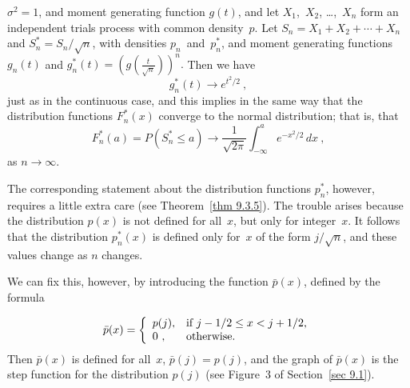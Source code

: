 $\sigma^2 = 1$, and moment generating function $g(t)$, and let $X_1$,~$X_2$,
\ldots,~$X_n$ form an independent trials process with common density~$p$.  Let
$S_n = X_1 + X_2 +\cdots+ X_n$ and $S_n^* = S_n/\sqrt n$, with densities
$p_n$~and~$p_n^*$, and moment generating functions $g_n(t)$ and
$g_n^*(t) = \left(g(\frac t{\sqrt n})\right)^n.$
Then we have
$$
g_n^*(t) \to e^{t^2/2}\ ,
$$
just as in the continuous case, and this implies in the same way that the
distribution functions $F_n^*(x)$ converge to the normal distribution; that is,
that
$$
F_n^*(a) = P(S_n^* \leq a) \to \frac1{\sqrt{2\pi}} \int_{-\infty}^a
e^{-x^2/2}\, dx\ ,
$$ 
as $n \rightarrow \infty$.
\par
The corresponding statement about the distribution functions $p_n^*$, however,
requires a little extra care (see Theorem~\ref{thm 9.3.5}).  The trouble arises
because the distribution $p(x)$ is not defined for all~$x$, but only for
integer~$x$.  It follows that the distribution $p_n^*(x)$ is defined only for~$x$ of
the form $j/\sqrt n$, and these values change as $n$ changes.

We can fix this, however, by introducing the function $\bar p(x)$, defined
by the formula

$$
\bar p(x) =  \left \{ \begin{array}{ll}
                        p(j), & \mbox{if $j - 1/2 \leq x < j + 1/2$,} \cr
                         0\ , & \mbox{otherwise}.\end{array}\right.
$$
Then $\bar p(x)$ is defined for all~$x$, $\bar p(j) = p(j)$, and the
graph of $\bar p(x)$ is the step function for the distribution $p(j)$ (see Figure~3
of Section~\ref{sec 9.1}).

